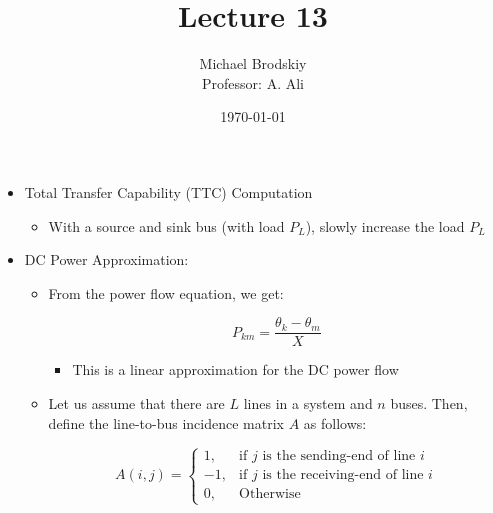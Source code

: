 


\title{Lecture 13}
\date{\today}
\author{Michael Brodskiy\\ \small Professor: A. Ali}



\maketitle

\begin{itemize}

  \item Total Transfer Capability (TTC) Computation

    \begin{itemize}

      \item With a source and sink bus (with load $P_L$), slowly increase the load $P_L$

    \end{itemize}

  \item DC Power Approximation:

    \begin{itemize}

      \item From the power flow equation, we get:

        $$P_{km}=\frac{\theta_k-\theta_m}{X}$$

        \begin{itemize}

          \item This is a linear approximation for the DC power flow

        \end{itemize}

      \item Let us assume that there are $L$ lines in a system and $n$ buses. Then, define the line-to-bus incidence matrix $A$ as follows:

        $$A(i,j)=\left\{\begin{array}{ll} 1,&\text{if $j$ is the sending-end of line $i$}\\ -1,&\text{if $j$ is the receiving-end of line $i$}\\0,&\text{Otherwise}\end{array}$$

    \end{itemize}

\end{itemize}




